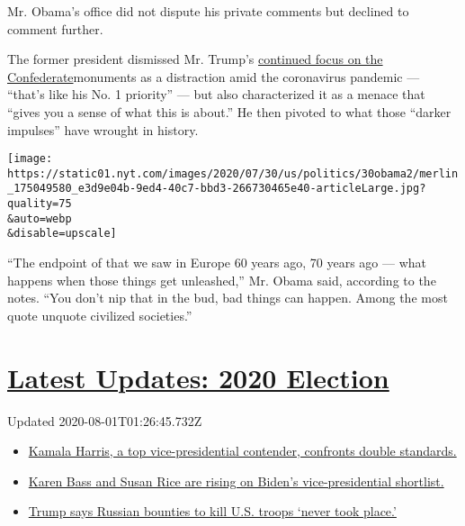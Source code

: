 Mr. Obama's office did not dispute his private comments but declined to
comment further.

The former president dismissed Mr. Trump's
\href{https://www.nytimes.com/2020/07/06/us/politics/trump-bubba-wallace-nascar.html}{continued
focus on the Confederate}monuments as a distraction amid the coronavirus
pandemic --- ``that's like his No. 1 priority'' --- but also
characterized it as a menace that ``gives you a sense of what this is
about.'' He then pivoted to what those ``darker impulses'' have wrought
in history.

\texttt{[image: https://static01.nyt.com/images/2020/07/30/us/politics/30obama2/merlin\_175049580\_e3d9e04b-9ed4-40c7-bbd3-266730465e40-articleLarge.jpg?quality=75\\\&auto=webp\\\&disable=upscale]}

``The endpoint of that we saw in Europe 60 years ago, 70 years ago ---
what happens when those things get unleashed,'' Mr. Obama said,
according to the notes. ``You don't nip that in the bud, bad things can
happen. Among the most quote unquote civilized societies.''

\hypertarget{latest-updates-2020-election}{%
\section{\texorpdfstring{\href{https://www.nytimes.com/2020/07/31/us/elections/biden-vs-trump.html?action=click\&pgtype=Article\&state=default\&region=MAIN_CONTENT_1\&context=storylines_live_updates}{Latest
Updates: 2020
Election}}{Latest Updates: 2020 Election}}\label{latest-updates-2020-election}}

Updated 2020-08-01T01:26:45.732Z

\begin{itemize}
\tightlist
\item
  \href{https://www.nytimes.com/2020/07/31/us/elections/biden-vs-trump.html?action=click\&pgtype=Article\&state=default\&region=MAIN_CONTENT_1\&context=storylines_live_updates\#link-29fdff45}{Kamala
  Harris, a top vice-presidential contender, confronts double
  standards.}
\item
  \href{https://www.nytimes.com/2020/07/31/us/elections/biden-vs-trump.html?action=click\&pgtype=Article\&state=default\&region=MAIN_CONTENT_1\&context=storylines_live_updates\#link-13ec3d9c}{Karen
  Bass and Susan Rice are rising on Biden's vice-presidential
  shortlist.}
\item
  \href{https://www.nytimes.com/2020/07/31/us/elections/biden-vs-trump.html?action=click\&pgtype=Article\&state=default\&region=MAIN_CONTENT_1\&context=storylines_live_updates\#link-49e9a016}{Trump
  says Russian bounties to kill U.S. troops `never took place.'}
\end{itemize}

